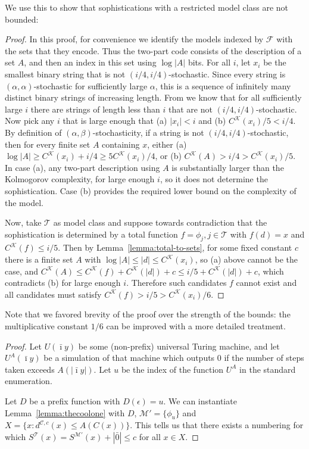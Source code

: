 \documentclass{style/llncs}
\newcommand{\M}{\mathscr M}
\newcommand{\C}{\mathscr C}
\newcommand{\T}{\mathscr T}
\newcommand{\F}{\mathscr F}
\newcommand{\K}{\mathscr K}
\newcommand{\s}{S}
\begin{document}
We use this to show that sophistications with a restricted model class are not bounded:
\dogfood*
\begin{proof}
In this proof, for convenience we identify the models indexed by $\F$ with the sets that they encode. Thus the two-part code consists of the description of a set $A$, and then an index in this set using $\log|A|$ bits.
For all $i$, let $x_i$ be the smallest binary string that is not $(i/4, i/4)$-stochastic. Since every string is $(\alpha,\alpha)$-stochastic for sufficiently large $\alpha$, this is a sequence of infinitely many distinct binary strings of increasing length. From \cite[Proposition~I.3 (b)]{gacs2001algorithmic} we know that for all sufficiently large $i$ there are strings of length less than $i$ that are not $(i/4, i/4)$-stochastic. Now pick any $i$ that is large enough that (a) $|x_i|<i$ and (b) $C^\K(x_i)/5 < i/4$. By definition of $(\alpha,\beta)$-stochasticity, if a string is not $(i/4,i/4)$-stochastic, then for every finite set $A$ containing $x$, either (a) $\log|A|\ge C^\K(x_i)+i/4\ge 5C^\K(x_i)/4$, or (b) $C^\K(A)>i/4>C^\K(x_i)/5$.
In case (a), any two-part description using $A$ is substantially larger than the Kolmogorov complexity, for large enough $i$, so it does not determine the sophistication. Case (b) provides the required lower bound on the complexity of the model.

Now, take $\T$ as model class and suppose towards contradiction that the sophistication is determined by a total function $f=\phi_j,j\in\T$ with $f(d)=x$ and $C^\K(f)\le i/5$. Then by Lemma~\ref{lemma:total-to-sets}, for some fixed constant $c$ there is a finite set $A$ with $\log|A|\le|d|\le C^\K(x_i)$, so (a) above cannot be the case, and $C^\K(A)\le C^\K(f)+C^\K(|d|)+c\le i/5+C^\K(|d|)+c$, which contradicts (b) for large enough $i$. Therefore such candidates $f$ cannot exist and all candidates must satisfy $C^\K(f)>i/5>C^\K(x_i)/6$.
\end{proof}

Note that we favored brevity of the proof over the strength of the bounds: the multiplicative constant $1/6$ can be improved with a more detailed treatment.

\depth*
\begin{proof}
Let $U(\bar\imath y)$ be some (non-prefix) universal Turing machine, and let $U^A(\bar\imath y)$ be a simulation of that machine which outputs $0$ if the number of steps taken exceeds $A(|\bar\imath y|)$. Let $u$ be the index of the function $U^A$ in the standard enumeration.

Let $D$ be a prefix function with $D(\epsilon) = u$. We can instantiate Lemma~\ref{lemma:thecoolone} with $D$, $\M' = \{\phi_u\}$ and $X = \{x : d^{\C,c}(x) \leq A(C(x))\}$. This tells us that there exists a numbering for which $\s^\T(x) = \s^{\M'}(x) + |\bar0| \leq c$ for all $x \in X$.
\end{proof}
\end{document}
